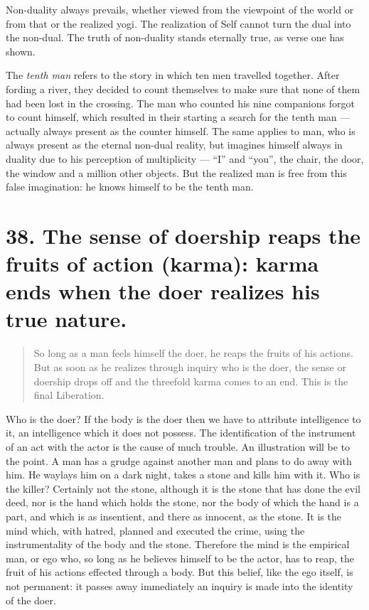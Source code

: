 \documentclass[12pt]{report}
\begin{document}

Non-duality always prevails, whether viewed from the viewpoint of the
world or from that or the realized yogi. The realization of Self
cannot turn the dual into the non-dual. The truth of non-duality
stands eternally true, as verse one has shown.

The \emph{tenth man} refers to the story in which ten men travelled
together. After fording a river, they decided to count themselves to
make sure that none of them had been lost in the crossing. The man who
counted his nine companions forgot to count himself, which resulted in
their starting a search for the tenth man --- actually always present
as the counter himself. The same applies to man, who is always present
as the eternal non-dual reality, but imagines himself always in
duality due to his perception of multiplicity --- ``I'' and ``you'',
the chair, the door, the window and a million other objects. But the
realized man is free from this false imagination: he knows himself to
be the tenth man.

\section{38. The sense of doership reaps the fruits of action (karma):
karma ends when the doer realizes his true nature.}

\begin{quote}
  So long as a man feels himself the doer, he reaps the fruits of his
  actions. But as soon as he realizes through inquiry who is the doer,
  the sense or doership drops off and the threefold karma comes to an
  end. This is the final Liberation.
\end{quote}


Who is the doer? If the body is the doer then we have to attribute
intelligence to it, an intelligence which it does not possess. The
identification of the instrument of an act with the actor is the cause
of much trouble. An illustration will be to the point. A man has a
grudge against another man and plans to do away with him. He waylays
him on a dark night, takes a stone and kills him with it. Who is the
killer? Certainly not the stone,  although it is the stone that has
done the evil deed, nor is the hand which holds the stone, nor the
body of which the hand is a part, and which is as insentient, and
there as innocent, as the stone. It is the mind which, with hatred,
planned and executed the crime, using the instrumentality of the body
and the stone. Therefore the mind is the empirical man, or ego who, so
long as he believes himself to be the actor, has to reap, the fruit of
his actions effected through a body. But this belief, like the ego
itself, is not permanent: it passes away immediately an inquiry is
made into the identity of the doer.
\end{document}
